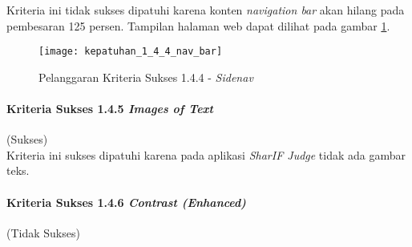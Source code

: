 Kriteria ini tidak sukses dipatuhi karena konten \textit{navigation bar} akan hilang pada pembesaran 125 persen. Tampilan halaman web dapat dilihat pada gambar \ref{fig:kepatuhan_1_4_4_nav_bar}.
\begin{figure}[H]
	\centering  
	\texttt{[image: kepatuhan\_1\_4\_4\_nav\_bar]}  
	\caption[Pelanggaran Kriteria Sukses 1.4.4 - \textit{Sidenav}]{Pelanggaran Kriteria Sukses 1.4.4 - \textit{Sidenav}} 
	\label{fig:kepatuhan_1_4_4_nav_bar} 
\end{figure}


\paragraph{Kriteria Sukses 1.4.5 \textit{Images of Text}}
\label{subsubsec:kepatuhan_kriteria_1.4.5}
(Sukses) \\

Kriteria ini sukses dipatuhi karena pada aplikasi \textit{SharIF Judge} tidak ada gambar teks.	

\paragraph{Kriteria Sukses 1.4.6 \textit{Contrast (Enhanced)}}
\label{subsubsec:kepatuhan_kriteria_1.4.6}

(Tidak Sukses) \\

